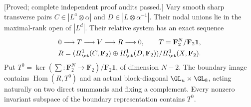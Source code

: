 \begin{lemma}
\label{lem:mixed-even-unequal-boundary-candidate}
\textup{[Proved; complete independent proof audits passed.]}
Vary smooth sharp transverse pairs
$C\in|L^a\otimes\alpha|$ and
$D\in|L\otimes\alpha^{-1}|$. Their nodal unions lie in
the maximal-rank open of $|L^d|$. Their relative system
has an exact sequence
\[
 \begin{gathered}
 0\longrightarrow T\longrightarrow V\longrightarrow R\longrightarrow0,
 \qquad T=\mathbf F_2^N/\mathbf F_2\mathbf1,\\
 R=(H^1_{\et}(C,\mathbf F_2)\oplus H^1_{\et}(D,\mathbf F_2))
                      /H^1_{\et}(X,\mathbf F_2).
 \end{gathered}
\]
Put $T^0=\ker(\sum:\mathbf F_2^N\to\mathbf F_2)/\mathbf F_2\mathbf1$,
of dimension $N-2$. The boundary image contains
$\operatorname{Hom}(R,T^0)$ and an actual block-diagonal
$\GL_u\times\GL_8$, acting naturally on two direct summands
and fixing a complement. Every nonzero invariant subspace
of the boundary representation contains $T^0$.
\end{lemma}
